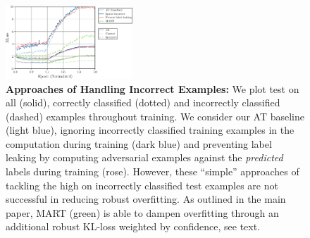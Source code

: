 \begin{figure}[t]
	\centering
	\vspace*{-0.2cm}
	\includegraphics[width=0.425\textwidth]{plots_supp_understanding_incorrect2}
	\vspace*{-6px}
	\caption{\textbf{Approaches of Handling Incorrect Examples:} We plot test \RCE on all (solid), correctly classified (dotted) and incorrectly classified (dashed) examples throughout training. We consider our AT baseline ({\color{plot0}light blue}), ignoring incorrectly classified training examples in the \RCE computation during training ({\color{plot1}dark blue}) and preventing label leaking by computing adversarial examples against the \emph{predicted} labels during training ({\color{plot2}rose}). However, these ``simple'' approaches of tackling the high \RCE on incorrectly classified test examples are not successful in reducing robust overfitting. As outlined in the main paper, MART \cite{WangICLR2020} ({\color{plot3}green}) is able to dampen overfitting through an additional robust KL-loss weighted by confidence, see text.}
	\label{fig:supp-ii-pll}
	\vspace*{-6px}
\end{figure}
